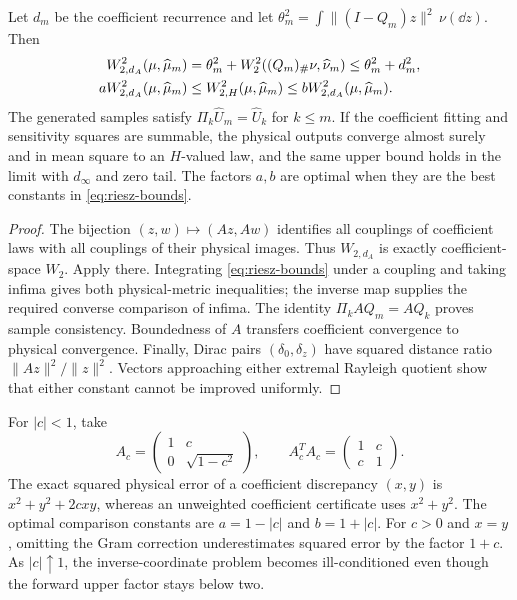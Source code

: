 \begin{theorem}\label{thm:riesz}
Let $d_m$ be the coefficient recurrence and let
$\theta_m^2=\int\|(I-Q_m)z\|^2\,\nu(\dd z)$. Then
\begin{align}\label{eq:riesz-certificate}
 W_{2,d_A}^2(\mu,\widehat\mu_m)
 &=\theta_m^2+W_2^2((Q_m)_\#\nu,\widehat\nu_m)
 \le\theta_m^2+d_m^2,\\
 aW_{2,d_A}^2(\mu,\widehat\mu_m)
 &\le W_{2,H}^2(\mu,\widehat\mu_m)
 \le bW_{2,d_A}^2(\mu,\widehat\mu_m).\notag
\end{align}
The generated samples satisfy $\Pi_k\widehat U_m=\widehat U_k$ for $k\le m$. If the coefficient fitting and sensitivity squares are summable, the physical outputs converge almost surely and in mean square to an $H$-valued law, and the same upper bound holds in the limit with $d_\infty$ and zero tail. The factors $a,b$ are optimal when they are the best constants in \eqref{eq:riesz-bounds}.
\end{theorem}
\begin{proof}
The bijection $(z,w)\mapsto(Az,Aw)$ identifies all couplings of coefficient laws with all couplings of their physical images. Thus $W_{2,d_A}$ is exactly coefficient-space $W_2$. Apply  there. Integrating \eqref{eq:riesz-bounds} under a coupling and taking infima gives both physical-metric inequalities; the inverse map supplies the required converse comparison of infima. The identity $\Pi_k A Q_m=AQ_k$ proves sample consistency. Boundedness of $A$ transfers coefficient convergence to physical convergence. Finally, Dirac pairs $(\delta_0,\delta_z)$ have squared distance ratio $\|Az\|^2/\|z\|^2$. Vectors approaching either extremal Rayleigh quotient show that either constant cannot be improved uniformly.
\end{proof}

\begin{example}
For $|c|<1$, take
\[
 A_c=\begin{pmatrix}1&c\\0&\sqrt{1-c^2}\end{pmatrix},\qquad
 A_c^TA_c=\begin{pmatrix}1&c\\c&1\end{pmatrix}.
\]
The exact squared physical error of a coefficient discrepancy $(x,y)$ is
$x^2+y^2+2cxy$, whereas an unweighted coefficient certificate uses $x^2+y^2$. The optimal comparison constants are $a=1-|c|$ and $b=1+|c|$. For $c>0$ and $x=y$, omitting the Gram correction underestimates squared error by the factor $1+c$. As $|c|\uparrow1$, the inverse-coordinate problem becomes ill-conditioned even though the forward upper factor stays below two.
\end{example}

